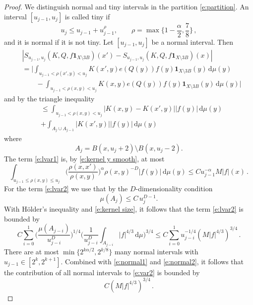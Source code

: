 \documentclass[12pt,reqno,a4paper,dvipsnames]{amsart}
\theoremstyle{plain}
\theoremstyle{definition}
\numberwithin{theorem}{section}
\numberwithin{equation}{section}
\newcommand{\AD}{D}
\begin{document}
\begin{proof}
    We distinguish normal and tiny intervals in the partition \eqref{e:partition}. 
    An interval $[u_{j-1}, u_j]$ is called tiny if 
    \[
        u_j \le u_{j-1} + u_{j-1}^\rho, \qquad \rho = \max\{1 - \frac{\alpha}{2}, \frac{7}{8}\}\,,
    \]
    and it is normal if it is not tiny. Let $[u_{j-1}, u_j]$ be a normal interval. Then 
    \begin{align*}
        &|S_{u_{j-1}, u_j}(K, Q, f \mathbf{1}_{X \setminus 3B})(x') - S_{u_{j-1}, u_j} (K, Q, f \mathbf{1}_{X \setminus 3B})(x)|\\
        &=  \Big\lvert \int_{u_{j-1} < \rho(x',y) < u_j} K(x', y) e(Q(y)) f(y) \mathbf{1}_{X \setminus 3B}(y) \, \mathrm{d}\mu(y)\\
        &\qquad- \int_{u_{j-1} < \rho(x,y) < u_j} K(x, y) e(Q(y)) f(y) \mathbf{1}_{X \setminus 3B}(y) \, \mathrm{d}\mu(y)\Big\rvert
    \end{align*}
    and by the triangle inequality
    \begin{align}
        &\le \int_{u_{j-1} < \rho(x,y) < u_j} |K(x,y) - K(x', y)| |f(y)| \, \mathrm{d}\mu(y)\label{e:lvar1}\\
        &+\int_{A_{j} \cup A_{j-1}} |K(x',y)| |f(y)| \, \mathrm{d}\mu(y)\label{e:lvar2}
    \end{align}
    where 
    \begin{equation}\label{e:ajdef}
        A_j = B(x, u_{j} + 2) \setminus B(x, u_{j} - 2).
    \end{equation}
    The term \eqref{e:lvar1} is, by \eqref{e:kernel y smooth}, at most
    \begin{equation}\label{e:normal1}
        \int_{u_{j-1} \le \rho(x,y) \le u_j} \Big( \frac{\rho(x,x')}{\rho(x,y)} \Big)^\alpha \rho(x,y)^{-\AD} |f(y)| \, \mathrm{d}\mu(y) \le C u_{j-1}^{-\alpha} M|f|(x)\,.
    \end{equation}
    For the term \eqref{e:lvar2} we use that by the $\AD$-dimensionality condition 
    \begin{equation}\label{e:smallAj}
        \mu(A_j) \le C \, u_j^{\AD - 1}.
    \end{equation}
    With Hölder's inequality and \eqref{e:kernel size}, it follows that the term \eqref{e:lvar2} is bounded by 
    \begin{equation}\label{e:normal2}
        C \sum_{i=0}^1  \Big(\frac{\mu(A_{j-i})}{u_{j-i}^\AD}\Big)^{1/4} \Big(\frac{1}{u_{j-i}^\AD} \int_{A_{j-i}} |f|^{4/3} \, \mathrm{d}\mu \Big)^{3/4} \le C \sum_{i=0}^1 u_{j-i}^{-1/4} (M|f|^{4/3})^{3/4}\,.
    \end{equation}
    There are at most $\min\{2^{k\alpha/2}, 2^{k/8}\}$ many normal intervals with $u_{j-1} \in [2^k, 2^{k+1}]$. Combined with \eqref{e:normal1} and \eqref{e:normal2}, it follows that the contribution of all normal intervals to \eqref{e:var2} is bounded by 
    \[
        C (M|f|^{4/3})^{3/4}\,.
    \]
    

\end{proof}
\end{document}
